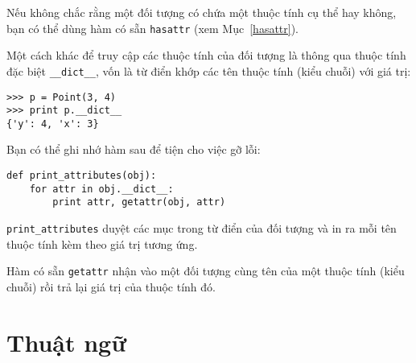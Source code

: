 \documentclass[11pt]{book}
\begin{document}

Nếu không chắc rằng một đối tượng có chứa một thuộc tính cụ thể
hay không, bạn có thể dùng hàm có sẵn {\tt hasattr} (xem Mục~\ref{hasattr}).


Một cách khác để truy cập các thuộc tính của đối tượng là thông qua
thuộc tính đặc biệt \verb"__dict__", vốn là từ điển khớp các tên
thuộc tính (kiểu chuỗi) với giá trị:

\beforeverb
\begin{verbatim}
>>> p = Point(3, 4)
>>> print p.__dict__
{'y': 4, 'x': 3}
\end{verbatim}
\afterverb
%
Bạn có thể ghi nhớ hàm sau để tiện cho việc gỡ lỗi:

\beforeverb
\begin{verbatim}
def print_attributes(obj):
    for attr in obj.__dict__:
        print attr, getattr(obj, attr)
\end{verbatim}
\afterverb
%
\verb"print_attributes" duyệt các mục trong từ điển của đối tượng
và in ra mỗi tên thuộc tính kèm theo giá trị tương ứng.


Hàm có sẵn {\tt getattr} nhận vào một đối tượng cùng tên của một
thuộc tính (kiểu chuỗi) rồi trả lại giá trị của thuộc tính đó.



\section{Thuật ngữ}
\end{document}
